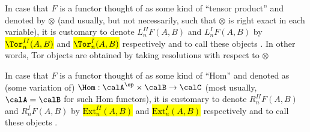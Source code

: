 \begin{definition}
    In case that $F$ is a functor thought of as some kind of ``tensor product'' and denoted by $\otimes$ (and usually, but not necessarily, such that $\otimes$ is right exact in each variable), it is customary to denote $L_n^{II} F(A,B)$ and $L_n^{I} F(A,B)$ by \hl{$\Tor_n^{II}(A,B)$} and \hl{$\Tor_n^{I}(A,B)$} respectively and to call these objects . In other words, Tor objects are obtained by taking  resolutions with respect to $\otimes$

    In case that $F$ is a functor thought of as some kind of ``Hom'' and denoted as (some variation of) $\Hom: \calA^{\op} \times \calB \to \calC$ (most usually, $\calA = \calB$ for such Hom functors), it is customary to denote $R_n^{II} F(A,B)$ and $R_n^{I} F(A,B)$ by \hl{$\mathrm{Ext}_n^{II}(A,B)$} and \hl{$\mathrm{Ext}_n^{I}(A,B)$} respectively and to call these objects . 
\end{definition}